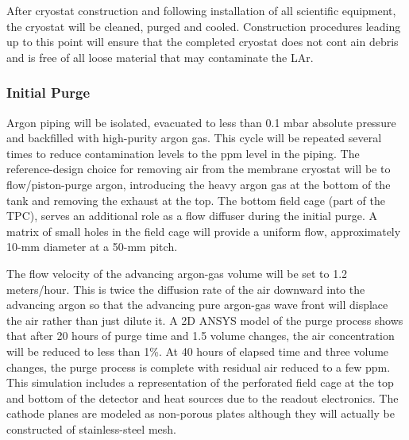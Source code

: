 After cryostat construction and following installation of all scientific equipment, the cryostat
will be cleaned, purged and cooled. Construction procedures leading up to this point will
ensure that the completed cryostat does not cont ain debris and is free of all loose material that may contaminate the LAr.

\subsubsection{Initial Purge}

Argon piping will be isolated, evacuated to less than 0.1 mbar absolute pressure and backfilled
with high-purity argon gas. This cycle will be repeated several times to reduce contamination
levels to the ppm level in the piping. The reference-design choice for removing air from the
membrane cryostat will be to flow/piston-purge argon, introducing the heavy argon gas at the
bottom of the tank and removing the exhaust at the top. The bottom field cage (part of the
TPC), serves an additional role as a flow diffuser during the initial
purge. A matrix of small holes in the field cage will provide a uniform flow, approximately
10-mm diameter at a 50-mm pitch. 

The flow velocity of the advancing argon-gas volume will be set to 1.2 meters/hour. This is twice the diffusion rate of the air downward into the advancing argon so that the advancing pure argon-gas wave front will displace the air rather than just dilute it. A
2D ANSYS model of the purge process shows that after 20 hours of purge time and 1.5 volume changes, the air concentration will be reduced to less than 1\%. At 40 hours of elapsed time and three volume
changes, the purge process is complete with residual air reduced to a few ppm. This
simulation includes a representation of the perforated field cage at the top and bottom of the
detector and heat sources due to the readout electronics. The cathode
planes are modeled as non-porous plates although they will actually be constructed of stainless-steel
mesh.

